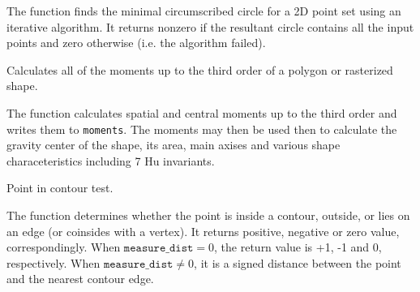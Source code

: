 The function finds the minimal circumscribed
circle for a 2D point set using an iterative algorithm. It returns nonzero
if the resultant circle contains all the input points and zero otherwise
(i.e. the algorithm failed).

Calculates all of the moments up to the third order of a polygon or rasterized shape.


\begin{description}
\end{description}

The function calculates spatial and central moments up to the third order and writes them to \texttt{moments}. The moments may then be used then to calculate the gravity center of the shape, its area, main axises and various shape characeteristics including 7 Hu invariants.

Point in contour test.


\begin{description}
\end{description}

The function determines whether the
point is inside a contour, outside, or lies on an edge (or coinsides
with a vertex). It returns positive, negative or zero value,
correspondingly. When $\texttt{measure\_dist} =0$, the return value
is +1, -1 and 0, respectively. When $\texttt{measure\_dist} \ne 0$,
it is a signed distance between the point and the nearest contour
edge.

